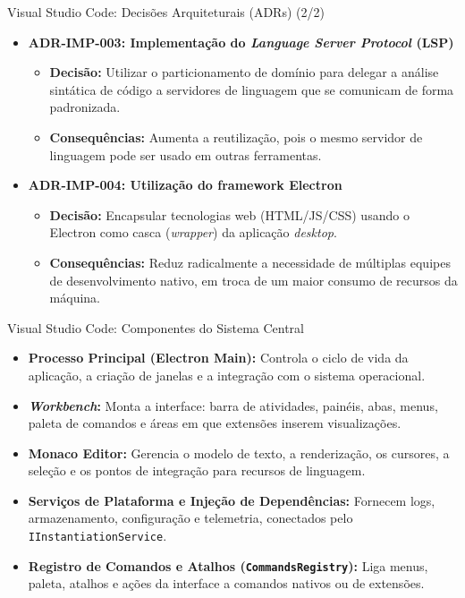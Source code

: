 \documentclass[aspectratio=169]{beamer}
\begin{document}
\begin{frame}{Visual Studio Code: Decisões Arquiteturais (ADRs) (2/2)}
\begin{itemize}\setlength{\itemsep}{0.8em}
\item \textbf{ADR-IMP-003: Implementação do \textit{Language Server Protocol} (LSP)}
  \begin{itemize}
  \item \textbf{Decisão:} Utilizar o particionamento de domínio para delegar a análise sintática de código a servidores de linguagem que se comunicam de forma padronizada.
  \item \textbf{Consequências:} Aumenta a reutilização, pois o mesmo servidor de linguagem pode ser usado em outras ferramentas.
  \end{itemize}
\item \textbf{ADR-IMP-004: Utilização do framework Electron}
  \begin{itemize}
  \item \textbf{Decisão:} Encapsular tecnologias web (HTML/JS/CSS) usando o Electron como casca (\textit{wrapper}) da aplicação \textit{desktop}.
  \item \textbf{Consequências:} Reduz radicalmente a necessidade de múltiplas equipes de desenvolvimento nativo, em troca de um maior consumo de recursos da máquina.
  \end{itemize}
\end{itemize}
\end{frame}

\begin{frame}{Visual Studio Code: Componentes do Sistema Central}
\begin{itemize}\setlength{\itemsep}{0.55em}
\item \textbf{Processo Principal (Electron Main):} Controla o ciclo de vida da aplicação, a criação de janelas e a integração com o sistema operacional.
\item \textbf{\textit{Workbench}:} Monta a interface: barra de atividades, painéis, abas, menus, paleta de comandos e áreas em que extensões inserem visualizações.
\item \textbf{Monaco Editor:} Gerencia o modelo de texto, a renderização, os cursores, a seleção e os pontos de integração para recursos de linguagem.
\item \textbf{Serviços de Plataforma e Injeção de Dependências:} Fornecem logs, armazenamento, configuração e telemetria, conectados pelo \texttt{IInstantiationService}.
\item \textbf{Registro de Comandos e Atalhos (\texttt{CommandsRegistry}):} Liga menus, paleta, atalhos e ações da interface a comandos nativos ou de extensões.
\end{itemize}
\end{frame}
\end{document}
